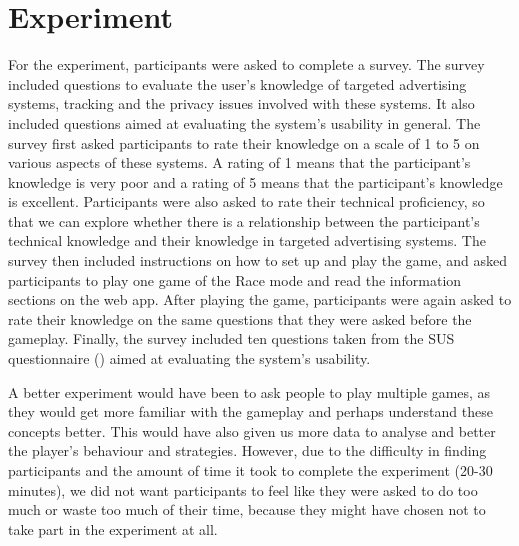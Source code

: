 \documentclass{l4proj}
\begin{document}
\section{Experiment}
For the experiment, participants were asked to complete a survey. The survey included questions to evaluate the user's knowledge of targeted advertising systems, tracking and the privacy issues involved with these systems. It also included questions aimed at evaluating the system's usability in general. The survey first asked participants to rate their knowledge on a scale of 1 to 5 on various aspects of these systems. A rating of 1 means that the participant's knowledge is very poor and a rating of 5 means that the participant's knowledge is excellent. Participants were also asked to rate their technical proficiency, so that we can explore whether there is a relationship between the participant's technical knowledge and their knowledge in targeted advertising systems. The survey then included instructions on how to set up and play the game, and asked participants to play one game of the Race mode and read the information sections on the web app. After playing the game, participants were again asked to rate their knowledge on the same questions that they were asked before the gameplay. Finally, the survey included ten questions taken from the SUS questionnaire (\cite{sus}) aimed at evaluating the system's usability.

A better experiment would have been to ask people to play multiple games, as they would get more familiar with the gameplay and perhaps understand these concepts better. This would have also given us more data to analyse and better the player's behaviour and strategies. However, due to the difficulty in finding participants and the amount of time it took to complete the experiment (20-30 minutes), we did not want participants to feel like they were asked to do too much or waste too much of their time, because they might have chosen not to take part in the experiment at all.
\end{document}
